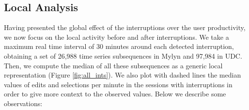 \documentclass[times]{smrauth}
\begin{document}
\subsection{Local Analysis}

Having presented the global effect of the interruptions over the user productivity, we now focus on the local activity before and after interruptions. We take a maximum real time interval of 30 minutes around each detected interruption, obtaining a set of 26,988 time series subsequences in Mylyn and 97,984 in UDC. Then, we compute the median of all these subsequences as a generic local representation (Figure \ref{fig:all_ints}). We also plot with dashed lines the median values of edits and selections per minute in the sessions with interruptions in order to give more context to the observed values.
Below we describe some observations:
\end{document}
